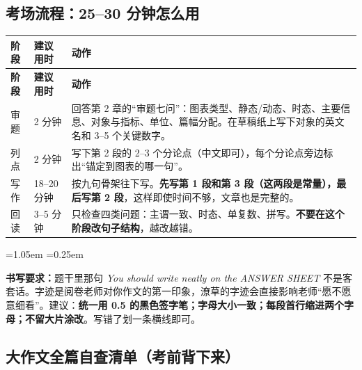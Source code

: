 \documentclass[11pt,a4paper]{ctexart}
\newcommand{\en}[1]{\textit{#1}}
\newenvironment{note}{%
  \par\addvspace{5pt}%
  \begin{list}{}{\leftmargin=1.05em \rightmargin=0.25em \listparindent=0pt
    \itemindent=0pt \topsep=0pt \parsep=2pt \itemsep=2pt \partopsep=0pt}%
  \item\relax\small\color{ink}%
}{%
  \end{list}\addvspace{5pt}%
}
\begin{document}
\subsection{考场流程：25--30 分钟怎么用}

\begin{longtable}{C{2.2cm} C{2.0cm} L{10.2cm}}
\toprule
\textbf{阶段} & \textbf{建议用时} & \textbf{动作}\\
\midrule
\endfirsthead
\toprule
\textbf{阶段} & \textbf{建议用时} & \textbf{动作}\\
\midrule
\endhead
审题 & 2 分钟 & 回答第 2 章的“审题七问”：图表类型、静态/动态、时态、主要信息、对象与指标、单位、篇幅分配。在草稿纸上写下对象的英文名和 3--5 个关键数字。\\
\midrule
列点 & 2 分钟 & 写下第 2 段的 2--3 个分论点（中文即可），每个分论点旁边标出“锚定到图表的哪一句”。\\
\midrule
写作 & 18--20 分钟 & 按九句骨架往下写。\textbf{先写第 1 段和第 3 段（这两段是常量），最后写第 2 段}，这样即使时间不够，文章也是完整的。\\
\midrule
回读 & 3--5 分钟 & 只检查四类问题：主谓一致、时态、单复数、拼写。\textbf{不要在这个阶段改句子结构}，越改越错。\\
\bottomrule
\end{longtable}

\begin{note}
\textbf{书写要求：}题干里那句 \en{You should write neatly on the ANSWER SHEET} 不是客套话。字迹是阅卷老师对你作文的第一印象，潦草的字迹会直接影响老师“愿不愿意细看”。建议：\textbf{统一用 0.5 的黑色签字笔；字母大小一致；每段首行缩进两个字母；不留大片涂改}。写错了划一条横线即可。
\end{note}

\subsection{大作文全篇自查清单（考前背下来）}
\end{document}
